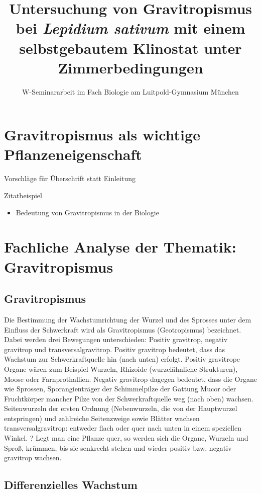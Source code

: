 \documentclass[
a4paper, 
11pt, 
ngerman,
listof=totoc,
bibliography=totocnumbered
]{scrreprt}
\title{Untersuchung von Gravitropismus bei \emph{Lepidium sativum} mit einem selbstgebautem Klinostat unter Zimmerbedingungen}
\subtitle{W-Seminararbeit im Fach Biologie am Luitpold-Gymnasium München}
\begin{document}
\maketitle
\tableofcontents

\chapter{Gravitropismus als wichtige Pflanzeneigenschaft}

Vorschläge für Überschrift statt {\glqq Einleitung\grqq} 

Zitatbeispiel \parencite[29]{campbell}


\begin{itemize}
	\item Bedeutung von Gravitropismus in der Biologie

\end{itemize}

\chapter{Fachliche Analyse der Thematik: Gravitropismus}

\section{Gravitropismus}
Die Bestimmung der Wachstumrichtung der Wurzel und des Sprosses unter dem Einfluss der Schwerkraft wird als Gravitropismus (Geotropismus) bezeichnet. Dabei werden drei Bewegungen unterschieden: Positiv gravitrop, negativ gravitrop und transversalgravitrop. Positiv gravitrop bedeutet, dass das Wachstum zur Schwerkraftquelle hin (nach unten) erfolgt. Positiv gravitrope Organe wären zum Beispiel Wurzeln, Rhizoide (wurzelähnliche Strukturen), Moose oder Farnprothallien. Negativ gravitrop dagegen bedeutet, dass die Organe wie Sprossen, Sporangienträger der Schimmelpilze der Gattung Mucor oder Fruchtkörper mancher Pilze von der Schwerkraftquelle weg (nach oben) wachsen. Seitenwurzeln der ersten Ordnung (Nebenwurzeln, die von der Hauptwurzel entspringen) und zahlreiche Seitenzweige sowie Blätter wachsen transversalgravitrop: entweder flach oder quer nach unten in einem speziellen Winkel. 
\parencite[449]{Strasburger}? Legt man eine Pflanze quer, so werden sich die Organe, Wurzeln und Sproß, krümmen, bis sie senkrecht stehen und wieder positiv bzw. negativ gravitrop wachsen.
\parencite[528]{Lüttge}

\section{Differenzielles Wachstum}
\end{document}
